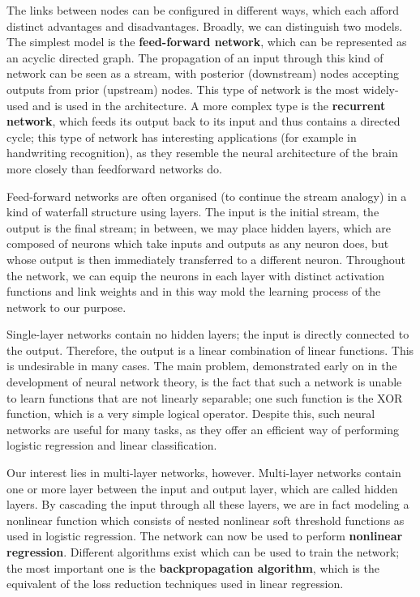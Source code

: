 The links between nodes can be configured in different ways, which
each afford distinct advantages and disadvantages. Broadly, we can
distinguish two models. The simplest model is the \textbf{feed-forward
  network}, which can be represented as an acyclic directed graph. The
propagation of an input through this kind of network can be seen as a
stream, with posterior (downstream) nodes accepting outputs from prior
(upstream) nodes. This type of network is the most widely-used and is
used in the architecture. A more complex type is the \textbf{recurrent
  network}, which feeds its output back to its input and thus contains a
directed cycle; this type of network has interesting applications (for
example in handwriting recognition), as they resemble the neural
architecture of the brain more closely than feedforward networks do.

Feed-forward networks are often organised (to continue the stream
analogy) in a kind of waterfall structure using layers. The input is
the initial stream, the output is the final stream; in between, we may
place hidden layers, which are composed of neurons which take inputs
and outputs as any neuron does, but whose output is then immediately
transferred to a different neuron. Throughout the network, we can
equip the neurons in each layer with distinct activation functions and
link weights and in this way mold the learning process of the network
to our purpose.

Single-layer networks contain no hidden layers; the input is directly
connected to the output. Therefore, the output is a linear combination
of linear functions. This is undesirable in many cases. The main
problem, demonstrated early on in the development of neural network
theory, is the fact that such a network is unable to learn functions
that are not linearly separable; one such function is the XOR
function, which is a very simple logical operator. Despite this, such
neural networks are useful for many tasks, as they offer an efficient
way of performing logistic regression and linear classification.

Our interest lies in multi-layer networks, however. Multi-layer
networks contain one or more layer between the input and output layer,
which are called hidden layers. By cascading the input through all
these layers, we are in fact modeling a nonlinear function which
consists of nested nonlinear soft threshold functions as used in
logistic regression. The network can now be used to perform \textbf{nonlinear
  regression}. Different algorithms exist which can be used to train the
network; the most important one is the \textbf{backpropagation algorithm},
which is the equivalent of the loss reduction techniques used in
linear regression.

